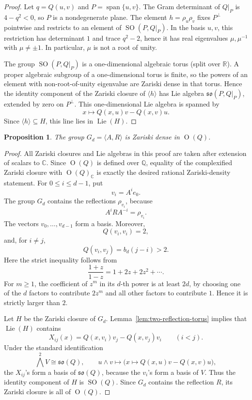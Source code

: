 \documentclass[a4paper,11pt]{amsart}
\newtheorem{proposition}[theorem]{Proposition}
\theoremstyle{remark}
\newcommand{\Q}{\mathbb Q}
\newcommand{\R}{\mathbb R}
\newcommand{\C}{\mathbb C}
\DeclareMathOperator{\Ogrp}{O}
\DeclareMathOperator{\SO}{SO}
\DeclareMathOperator{\Lie}{Lie}
\numberwithin{equation}{section}
\begin{document}
\begin{proof}
Let \(q=Q(u,v)\) and \(P=\operatorname{span}\{u,v\}\).  The Gram determinant of \(Q|_P\) is \(4-q^2<0\), so \(P\) is a nondegenerate plane.  The element \(h=\rho_u\rho_v\) fixes \(P^\perp\) pointwise and restricts to an element of \(\SO(P,Q|_P)\).  In the basis \(u,v\), this restriction has determinant \(1\) and trace \(q^2-2\), hence it has real eigenvalues \(\mu,\mu^{-1}\) with \(\mu\ne\pm1\).  In particular, \(\mu\) is not a root of unity.

The group \(\SO(P,Q|_P)\) is a one-dimensional algebraic torus (split over \(\R\)).  A proper algebraic subgroup of a one-dimensional torus is finite, so the powers of an element with non-root-of-unity eigenvalue are Zariski dense in that torus.  Hence the identity component of the Zariski closure of \(\langle h\rangle\) has Lie algebra \(\mathfrak{so}(P,Q|_P)\), extended by zero on \(P^\perp\).  This one-dimensional Lie algebra is spanned by
\[
        x\longmapsto Q(x,u)v-Q(x,v)u.
\]
Since \(\langle h\rangle\subseteq H\), this line lies in \(\Lie(H)\).
\end{proof}

\begin{proposition}\label{prop:zariski}
The group \(G_d=\langle A,R\rangle\) is Zariski dense in \(\Ogrp(Q)\).
\end{proposition}

\begin{proof}
All Zariski closures and Lie algebras in this proof are taken after extension of scalars to \(\C\).  Since \(\Ogrp(Q)\) is defined over \(\Q\), equality of the complexified Zariski closure with \(\Ogrp(Q)_\C\) is exactly the desired rational Zariski-density statement.  For \(0\le i\le d-1\), put
\[
        v_i=A^ie_0.
\]
The group \(G_d\) contains the reflections \(\rho_{v_i}\), because
\[
        A^iRA^{-i}=\rho_{v_i}.
\]
The vectors \(v_0,\ldots,v_{d-1}\) form a basis.  Moreover,
\[
        Q(v_i,v_i)=2,
\]
and, for \(i\ne j\),
\[
        Q(v_i,v_j)=b_d(j-i)>2.
\]
Here the strict inequality follows from
\[
        \frac{1+z}{1-z}=1+2z+2z^2+\cdots.
\]
For \(m\ge1\), the coefficient of \(z^m\) in its \(d\)-th power is at least \(2d\), by choosing one of the \(d\) factors to contribute \(2z^m\) and all other factors to contribute \(1\).  Hence it is strictly larger than \(2\).

Let \(H\) be the Zariski closure of \(G_d\).  Lemma~\ref{lem:two-reflection-torus} implies that \(\Lie(H)\) contains
\[
        X_{ij}(x)=Q(x,v_i)v_j-Q(x,v_j)v_i
        \qquad(i<j).
\]
Under the standard identification
\[
        \bigwedge^2 V\cong\mathfrak{so}(Q),
        \qquad
        u\wedge v\mapsto\bigl(x\mapsto Q(x,u)v-Q(x,v)u\bigr),
\]
the \(X_{ij}\)'s form a basis of \(\mathfrak{so}(Q)\), because the \(v_i\)'s form a basis of \(V\).  Thus the identity component of \(H\) is \(\SO(Q)\).  Since \(G_d\) contains the reflection \(R\), its Zariski closure is all of \(\Ogrp(Q)\).
\end{proof}
\end{document}
